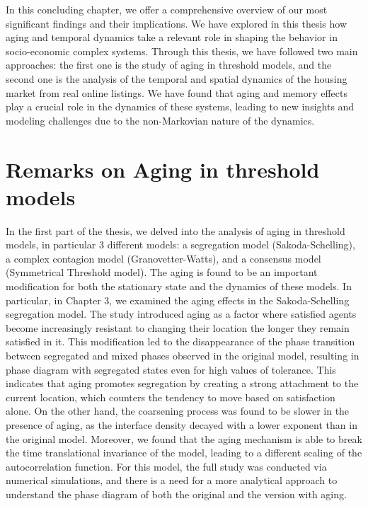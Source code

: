 In this concluding chapter, we offer a comprehensive overview of our most significant findings and their implications. We have explored in this thesis how aging and temporal dynamics take a relevant role in shaping the behavior in socio-economic complex systems. Through this thesis, we have followed two main approaches: the first one is the study of aging in threshold models, and the second one is the analysis of the temporal and spatial dynamics of the housing market from real online listings. We have found that aging and memory effects play a crucial role in the dynamics of these systems, leading to new insights and modeling challenges due to the non-Markovian nature of the dynamics.

\section{Remarks on Aging in threshold models \label{sec:aging_threshold_models}}

In the first part of the thesis, we delved into the analysis of aging in threshold models, in particular 3 different models: a segregation model (Sakoda-Schelling), a complex contagion model (Granovetter-Watts), and a consensus model (Symmetrical Threshold model). The aging is found to be an important modification for both the stationary state and the dynamics of these models. In particular, in Chapter 3, we examined the aging effects in the Sakoda-Schelling segregation model. The study introduced aging as a factor where satisfied agents become increasingly resistant to changing their location the longer they remain satisfied in it. This modification led to the disappearance of the phase transition between segregated and mixed phases observed in the original model, resulting in phase diagram with segregated states even for high values of tolerance. This indicates that aging promotes segregation by creating a strong attachment to the current location, which counters the tendency to move based on satisfaction alone. On the other hand, the coarsening process was found to be slower in the presence of aging, as the interface density decayed with a lower exponent than in the original model. Moreover, we found that the aging mechanism is able to break the time translational invariance of the model, leading to a different scaling of the autocorrelation function. For this model, the full study was conducted via numerical simulations, and there is a need for a more analytical approach to understand the phase diagram of both the original and the version with aging.

